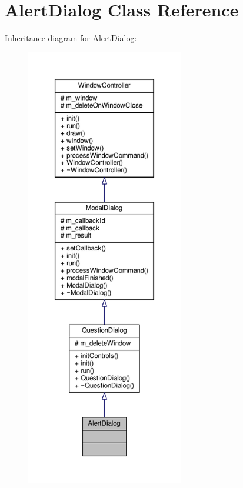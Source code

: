 \hypertarget{classAlertDialog}{}\section{Alert\+Dialog Class Reference}
\label{classAlertDialog}


Inheritance diagram for Alert\+Dialog\+:
\nopagebreak
\begin{figure}[H]
\begin{center}
\leavevmode
\includegraphics[height=550pt]{d4/d10/classAlertDialog__inherit__graph}
\end{center}
\end{figure}


